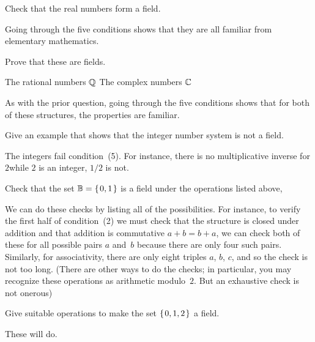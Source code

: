 \begin{exercises}
  \item 
    Check that the real numbers form a field.
    \begin{answer}
      Going through the five conditions shows that they are all familiar from 
      elementary mathematics.
    \end{answer}
  \item 
    Prove that these are fields.
    \begin{exparts*}
       \partsitem The rational numbers $\mathbb{Q}$
       \partsitem The complex numbers  $\mathbb{C}$
    \end{exparts*}
    \begin{answer}
      As with the prior question, going through the five conditions 
      shows that
      for both of these structures, 
      the properties are familiar.
    \end{answer}
  \item 
     Give an example that shows that the integer number system
     is not a field.
     \begin{answer}
       The integers fail condition~(5).
       For instance, there is no multiplicative inverse for $2$\Dash while
       $2$ is an integer, $1/2$ is not.
     \end{answer}
  \item \label{exer:BinField} 
     Check that the set $\mathbb{B}=\mbox{$\{\hspace{0.1em}0,1\hspace{0.1em}\}$}$ is a field under the operations 
     listed above, 
     \begin{answer}
       We can do these checks by listing all of the possibilities.
       For instance, to verify the first half of condition~(2) we must check
       that the structure is closed under addition and that addition
       is commutative  $a+b=b+a$,
       we can check both of these 
       for all possible pairs $a$ and~$b$ because there
       are only four such pairs.  
       Similarly, for associativity, there are only eight triples $a$, $b$,
       $c$, and so the check is not too long.
       (There are other ways to do the checks; in particular, you may 
       recognize these operations as arithmetic modulo~$2$.
       But an exhaustive check is not onerous)
     \end{answer}
  \item 
     Give suitable operations to make the set $\mbox{$\{\hspace{0.1em}0,1,2\hspace{0.1em}\}$}$
     a field.     
     \begin{answer}
       These will do.
       \begin{center}
          \begin{tabular}{c|ccc}

\end{tabular}
\end{center}
\end{answer}
\end{exercises}
